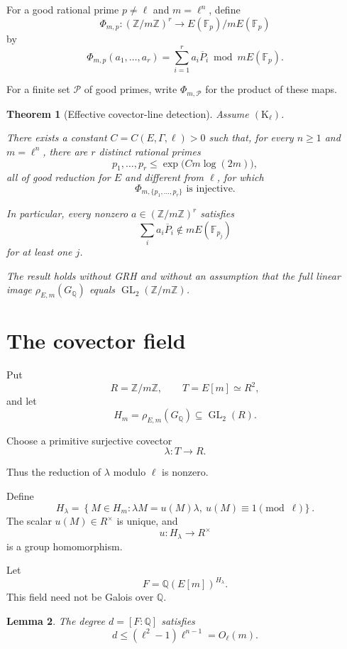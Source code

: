 \documentclass[11pt]{article}
\newtheorem{theorem}{Theorem}
\newtheorem{lemma}[theorem]{Lemma}
\begin{document}
For a good rational prime $p\ne\ell$ and
$m=\ell^n$, define
\[
\Phi_{m,p}:
(\mathbb Z/m\mathbb Z)^r
\longrightarrow E(\mathbb F_p)/mE(\mathbb F_p)
\]
by
\[
\Phi_{m,p}(a_1,\ldots,a_r)
=\sum_{i=1}^r a_i\overline P_i
\bmod mE(\mathbb F_p).
\]

For a finite set $\mathcal P$ of good primes,
write $\Phi_{m,\mathcal P}$ for the product
of these maps.

\begin{theorem}[Effective covector-line detection]
\label{thm:main}
Assume $(\mathrm K_\ell)$.

There exists a constant
$C=C(E,\Gamma,\ell)>0$ such that, for every
$n\ge1$ and $m=\ell^n$, there are $r$
distinct rational primes
\[
p_1,\ldots,p_r
\le \exp\!\bigl(Cm\log(2m)\bigr),
\]
all of good reduction for $E$ and different
from $\ell$, for which
\[
\boxed{
\Phi_{m,\{p_1,\ldots,p_r\}}
\text{ is injective}.
}
\]

In particular, every nonzero
$a\in(\mathbb Z/m\mathbb Z)^r$ satisfies
\[
\sum_i a_i\overline P_i
\notin mE(\mathbb F_{p_j})
\]
for at least one $j$.

The result holds without GRH and without an
assumption that the full linear image
$\rho_{E,m}(G_{\mathbb Q})$ equals
$\operatorname{GL}_2(\mathbb Z/m\mathbb Z)$.
\end{theorem}

\section{The covector field}

Put
\[
R=\mathbb Z/m\mathbb Z,\qquad
T=E[m]\simeq R^2,
\]
and let
\[
H_m=\rho_{E,m}(G_{\mathbb Q})
\subseteq\operatorname{GL}_2(R).
\]

Choose a primitive surjective covector
\[
\lambda:T\longrightarrow R.
\]

Thus the reduction of $\lambda$ modulo
$\ell$ is nonzero.

Define
\[
H_\lambda=
\left\{
M\in H_m:
\lambda M=u(M)\lambda,\
u(M)\equiv1\pmod\ell
\right\}.
\]
The scalar $u(M)\in R^\times$ is unique,
and
\[
u:H_\lambda\longrightarrow R^\times
\]
is a group homomorphism.

Let
\[
F=\mathbb Q(E[m])^{H_\lambda}.
\]
This field need not be Galois over
$\mathbb Q$.

\begin{lemma}
\label{lem:degree}
The degree $d=[F:\mathbb Q]$ satisfies
\[
\boxed{
d\le(\ell^2-1)\ell^{n-1}
=O_\ell(m).
}
\]
\end{lemma}
\end{document}
